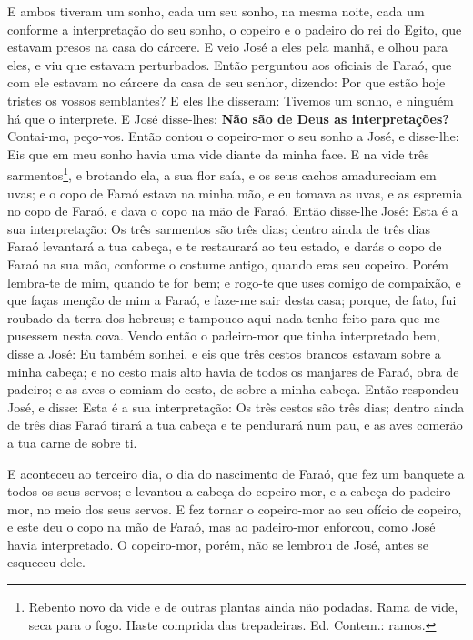 E ambos tiveram um sonho, cada um seu sonho, na mesma noite, cada
um conforme a interpretação do seu sonho, o copeiro e o padeiro do
rei do Egito, que estavam presos na casa do cárcere. E veio José
a eles pela manhã, e olhou para eles, e viu que estavam perturbados.
Então perguntou aos oficiais de Faraó, que com ele estavam no
cárcere da casa de seu senhor, dizendo: Por que estão hoje tristes
os vossos semblantes? E eles lhe disseram: Tivemos um sonho, e
ninguém há que o interprete. E José disse-lhes: \textbf{Não são de
Deus as interpretações?} Contai-mo, peço-vos. Então contou o
copeiro-mor o seu sonho a José, e disse-lhe: Eis que em meu sonho
havia uma vide diante da minha face. E na vide três
sarmentos\footnote{Rebento novo da vide e de outras plantas ainda
não podadas. Rama de vide, seca para o fogo. Haste comprida das
trepadeiras. Ed. Contem.: ramos.}, e brotando ela, a sua flor saía,
e os seus cachos amadureciam em uvas; e o copo de Faraó
estava na minha mão, e eu tomava as uvas, e as espremia no copo de
Faraó, e dava o copo na mão de Faraó. Então disse-lhe José:
Esta é a sua interpretação: Os três sarmentos são três dias;
dentro ainda de três dias Faraó levantará a tua cabeça, e te
restaurará ao teu estado, e darás o copo de Faraó na sua mão,
conforme o costume antigo, quando eras seu copeiro. Porém
lembra-te de mim, quando te for bem; e rogo-te que uses comigo de
compaixão, e que faças menção de mim a Faraó, e faze-me sair desta
casa; porque, de fato, fui roubado da terra dos hebreus; e
tampouco aqui nada tenho feito para que me pusessem nesta cova.
Vendo então o padeiro-mor que tinha interpretado bem, disse a
José: Eu também sonhei, e eis que três cestos brancos estavam sobre
a minha cabeça; e no cesto mais alto havia de todos os
manjares de Faraó, obra de padeiro; e as aves o comiam do cesto, de
sobre a minha cabeça. Então respondeu José, e disse: Esta é a
sua interpretação: Os três cestos são três dias; dentro ainda
de três dias Faraó tirará a tua cabeça e te pendurará num pau, e as
aves comerão a tua carne de sobre ti.

E aconteceu ao terceiro dia, o dia do nascimento de Faraó, que
fez um banquete a todos os seus servos; e levantou a cabeça do
copeiro-mor, e a cabeça do padeiro-mor, no meio dos seus servos.
E fez tornar o copeiro-mor ao seu ofício de copeiro, e este
deu o copo na mão de Faraó, mas ao padeiro-mor enforcou, como
José havia interpretado. O copeiro-mor, porém, não se lembrou
de José, antes se esqueceu dele.

\smallskip

